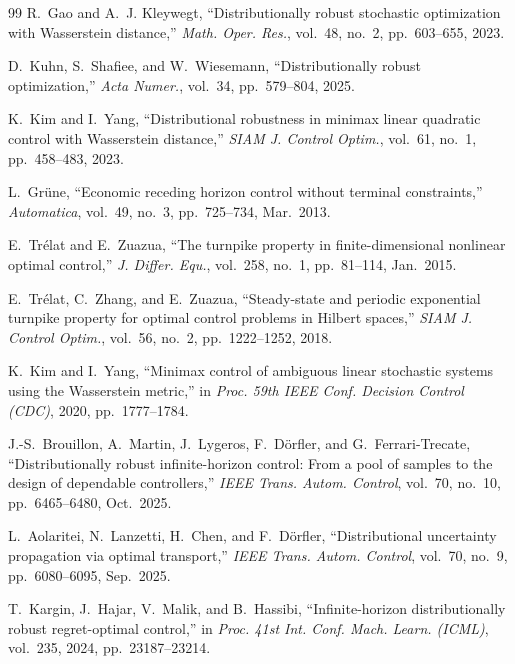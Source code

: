 \documentclass[10pt,journal,twoside]{IEEEtran}
\theoremstyle{definition}
\theoremstyle{remark}
\begin{document}
\begin{thebibliography}{99}
R.~Gao and A.~J. Kleywegt,
\newblock ``Distributionally robust stochastic optimization with
Wasserstein distance,''
\newblock \emph{Math. Oper. Res.}, vol.~48, no.~2, pp.~603--655, 2023.

D.~Kuhn, S.~Shafiee, and W.~Wiesemann,
\newblock ``Distributionally robust optimization,''
\newblock \emph{Acta Numer.}, vol.~34, pp.~579--804, 2025.

K.~Kim and I.~Yang,
\newblock ``Distributional robustness in minimax linear quadratic control
with Wasserstein distance,''
\newblock \emph{SIAM J. Control Optim.}, vol.~61, no.~1,
pp.~458--483, 2023.

L.~Gr{\"u}ne,
\newblock ``Economic receding horizon control without terminal
constraints,''
\newblock \emph{Automatica}, vol.~49, no.~3, pp.~725--734, Mar.~2013.

E.~Tr{\'e}lat and E.~Zuazua,
\newblock ``The turnpike property in finite-dimensional nonlinear optimal
control,''
\newblock \emph{J. Differ. Equ.}, vol.~258, no.~1, pp.~81--114,
Jan.~2015.

E.~Tr{\'e}lat, C.~Zhang, and E.~Zuazua,
\newblock ``Steady-state and periodic exponential turnpike property for
optimal control problems in Hilbert spaces,''
\newblock \emph{SIAM J. Control Optim.}, vol.~56, no.~2,
pp.~1222--1252, 2018.

K.~Kim and I.~Yang,
\newblock ``Minimax control of ambiguous linear stochastic systems using
the Wasserstein metric,''
\newblock in \emph{Proc. 59th IEEE Conf. Decision Control (CDC)}, 2020,
pp.~1777--1784.

J.-S.~Brouillon, A.~Martin, J.~Lygeros, F.~D{\"o}rfler, and
G.~Ferrari-Trecate,
\newblock ``Distributionally robust infinite-horizon control: From a pool
of samples to the design of dependable controllers,''
\newblock \emph{IEEE Trans. Autom. Control}, vol.~70, no.~10,
pp.~6465--6480, Oct.~2025.

L.~Aolaritei, N.~Lanzetti, H.~Chen, and F.~D{\"o}rfler,
\newblock ``Distributional uncertainty propagation via optimal
transport,''
\newblock \emph{IEEE Trans. Autom. Control}, vol.~70, no.~9,
pp.~6080--6095, Sep.~2025.

T.~Kargin, J.~Hajar, V.~Malik, and B.~Hassibi,
\newblock ``Infinite-horizon distributionally robust regret-optimal
control,''
\newblock in \emph{Proc. 41st Int. Conf. Mach. Learn. (ICML)}, vol.~235,
2024, pp.~23187--23214.


\end{thebibliography}
\end{document}
